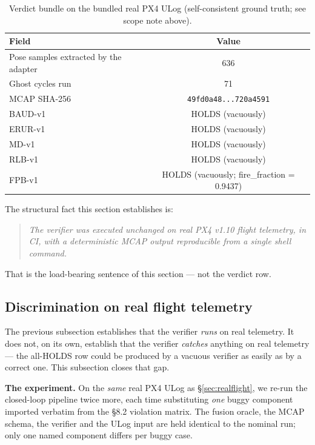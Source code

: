 \documentclass[11pt,a4paper]{article}
\begin{document}
\begin{table}[h]
\centering
\small
\begin{tabular}{lc}
\toprule
\textbf{Field} & \textbf{Value} \\
\midrule
Pose samples extracted by the adapter & 636 \\
Ghost cycles run                      & 71 \\
MCAP SHA-256                          & \texttt{49fd0a48...720a4591} \\
BAUD-v1                                & HOLDS (vacuously) \\
ERUR-v1                                & HOLDS (vacuously) \\
MD-v1                                  & HOLDS (vacuously) \\
RLB-v1                                 & HOLDS (vacuously) \\
FPB-v1                                 & HOLDS (vacuously; fire\_fraction = 0.9437) \\
\bottomrule
\end{tabular}
\caption{Verdict bundle on the bundled real PX4 ULog
(self-consistent ground truth; see scope note above).}
\label{tab:real-verdict}
\end{table}

The structural fact this section establishes is:

\begin{quote}
\itshape
The verifier was executed unchanged on real PX4 v1.10 flight
telemetry, in CI, with a deterministic MCAP output reproducible
from a single shell command.
\end{quote}

That is the load-bearing sentence of this section --- not the
verdict row.

\subsection{Discrimination on real flight telemetry}
\label{sec:realflight-discrim}

The previous subsection establishes that the verifier \emph{runs}
on real telemetry. It does not, on its own, establish that the
verifier \emph{catches} anything on real telemetry --- the
all-HOLDS row could be produced by a vacuous verifier as easily
as by a correct one. This subsection closes that gap.

\textbf{The experiment.} On the \emph{same} real PX4 ULog as
\S\ref{sec:realflight}, we re-run the closed-loop pipeline twice
more, each time substituting \emph{one} buggy component imported
verbatim from the \S8.2 violation matrix. The fusion oracle, the
MCAP schema, the verifier and the ULog input are held identical
to the nominal run; only one named component differs per buggy
case.
\end{document}
